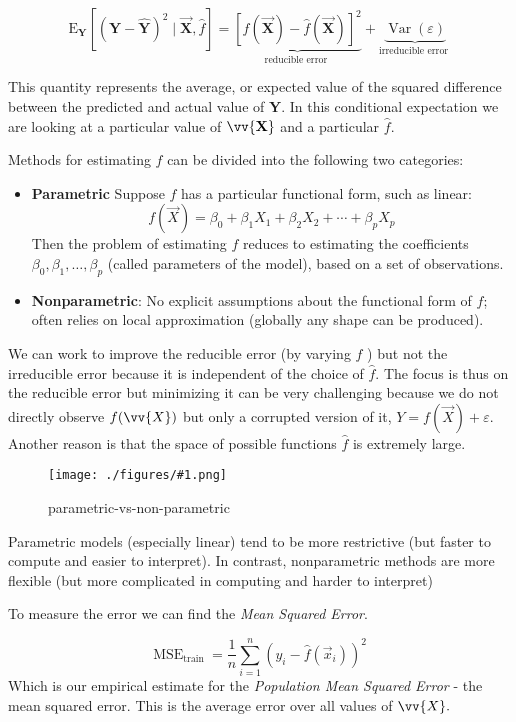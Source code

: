 \documentclass{report}
\newcommand{\incpng}[1]{
   \begin{figure}[ht]
    \centering
    \texttt{[image: ./figures/\#1.png]}
    \caption{#1}
    \label{fig:#1}
   \end{figure}
}
\begin{document}
$$\mathrm{E}_{\mathbf{Y}}\left[(\mathbf{Y}-\hat{\mathbf{Y}})^2 \mid \vec{\mathbf{X}}, \hat{f}\right]=\underbrace{[f(\vec{\mathbf{X}})-\hat{f}(\vec{\mathbf{X}})]^2}_{\text {reducible error }}+\underbrace{\operatorname{Var}(\varepsilon)}_{\text {irreducible error }}$$

This quantity represents the average, or expected value of the squared difference between the predicted and actual value of \textbf{Y}. In this conditional expectation we are looking at a particular value of $\vv{\mathbf{X}}$ and a particular $\hat{f}.$

\bigskip

Methods for estimating $f$ can be divided into the following two categories:
\begin{itemize}
  \item  \textbf{Parametric} Suppose $f$ has a particular functional form, such as linear:
$$
f(\vec{X})=\beta_0+\beta_1 X_1+\beta_2 X_2+\cdots+\beta_p X_p
$$
Then the problem of estimating $f$ reduces to estimating the coefficients $\beta_0, \beta_1, \ldots, \beta_p$ (called parameters of the model), based on a set of observations.

\item  \textbf{Nonparametric}: No explicit assumptions about the functional form of $f$; often relies on local approximation (globally any shape can be produced).


\end{itemize}
  We can work to improve the reducible error (by varying $\hat{f}$ ) but not the irreducible error because it is independent of the choice of $\hat{f}$.
The focus is thus on the reducible error but minimizing it can be very challenging because we do not directly observe $f(\vv{X})$ but only a corrupted version of it, $Y=f(\vec{X})+\varepsilon$.
Another reason is that the space of possible functions $\hat{f}$ is extremely large.


\incpng{parametric-vs-non-parametric}
Parametric models (especially linear) tend to be more restrictive (but faster to compute and easier to interpret). In contrast, nonparametric methods are more flexible (but more complicated in computing and harder to interpret)

\bigskip


To measure the error we can find the \textit{Mean Squared Error}.

$$\mathrm{MSE}_{\text {train }}=\frac{1}{n} \sum_{i=1}^n\left(y_i-\hat{f}\left(\vec{x}_i\right)\right)^2$$
Which is our empirical estimate for the \textit{Population Mean Squared Error} - the mean squared error. This is the average error over all values of $\vv{X}.$
\end{document}
